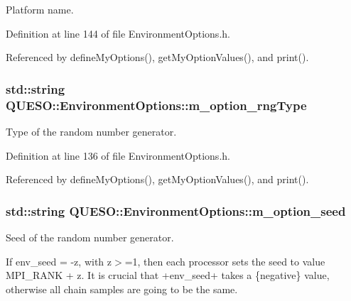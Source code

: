 Platform name. 



Definition at line 144 of file Environment\-Options.\-h.



Referenced by define\-My\-Options(), get\-My\-Option\-Values(), and print().

\hypertarget{class_q_u_e_s_o_1_1_environment_options_afe9a3368caa5bcc6466bb958a43221bc}{
\subsubsection[{m\-\_\-option\-\_\-rng\-Type}]{\setlength{\rightskip}{0pt plus 5cm}std\-::string Q\-U\-E\-S\-O\-::\-Environment\-Options\-::m\-\_\-option\-\_\-rng\-Type\hspace{0.3cm}{\ttfamily [private]}}}\label{class_q_u_e_s_o_1_1_environment_options_afe9a3368caa5bcc6466bb958a43221bc}


Type of the random number generator. 



Definition at line 136 of file Environment\-Options.\-h.



Referenced by define\-My\-Options(), get\-My\-Option\-Values(), and print().

\hypertarget{class_q_u_e_s_o_1_1_environment_options_af5e8b8eee6336e047956e262a42e9996}{
\subsubsection[{m\-\_\-option\-\_\-seed}]{\setlength{\rightskip}{0pt plus 5cm}std\-::string Q\-U\-E\-S\-O\-::\-Environment\-Options\-::m\-\_\-option\-\_\-seed\hspace{0.3cm}{\ttfamily [private]}}}\label{class_q_u_e_s_o_1_1_environment_options_af5e8b8eee6336e047956e262a42e9996}


Seed of the random number generator. 

If env\-\_\-seed = -\/z, with z$>$=1, then each processor sets the seed to value M\-P\-I\-\_\-\-R\-A\-N\-K + z. It is crucial that +env\-\_\-seed+ takes a \{negative\} value, otherwise all chain samples are going to be the same. 


